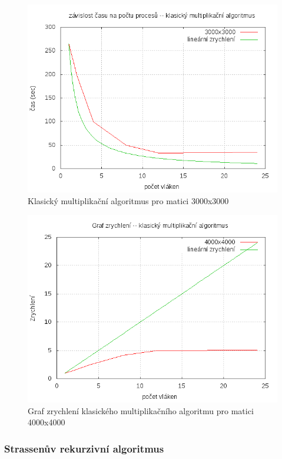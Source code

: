 \documentclass[12pt,a4paper]{article}
\begin{document}
\pagebreak
\begin{figure}[h]
\includegraphics[width=\textwidth]{graph/classic-3000.png}
\caption{Klasický multiplikační algoritmus pro matici 3000x3000}
\label{data4}
\end{figure}

\pagebreak
\begin{figure}[h]
\includegraphics[width=\textwidth]{graph/classic-acc.png}
\caption{Graf zrychlení klasického multiplikačního algoritmu pro matici 4000x4000}
\label{data4}
\end{figure}



\pagebreak
\subsubsection{Strassenův rekurzivní algoritmus}
\end{document}
